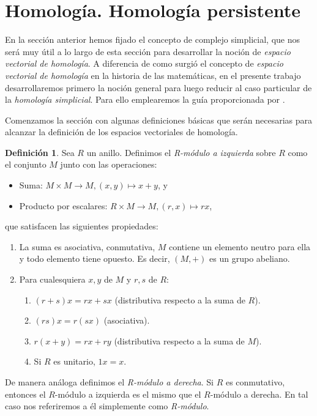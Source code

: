 \documentclass[12pt, a4paper, twoside]{book}
\numberwithin{equation}{section}
\theoremstyle{definition}
\newtheorem{defi}{Definición}[section]
\theoremstyle{remark}
\theoremstyle{plain}
\begin{document}
	\section{Homología. Homología persistente}
	
	En la sección anterior hemos fijado el concepto de complejo 
	simplicial, que nos será muy útil a lo largo de esta sección para 
	desarrollar la noción de \emph{espacio vectorial de homología}. A 
	diferencia de como surgió el concepto de \emph{espacio vectorial de
	homología} en la historia de las matemáticas, en el presente trabajo 
	desarrollaremos primero la noción general para luego reducir al caso 
	particular de la \emph{homología simplicial}. Para ello emplearemos la 
	guía proporcionada por \cite{TopoAlg-Edelsbrunner,Homologia-Macho,
	Algebra-Elduque}.

	Comenzamos la sección con algunas definiciones básicas que serán 
	necesarias para alcanzar la definición de los espacios vectoriales de 
	homología.

	\begin{defi}
		Sea $R$ un anillo. Definimos el \textit{R-módulo a izquierda} 
		sobre
		$R$ como el conjunto $M$ junto con las operaciones:
		\begin{itemize}
			\item Suma: $M \times M \rightarrow M, (x,y) \mapsto 
				x+y$, y
			\item Producto por escalares: $R \times M \rightarrow 
				M, (r,x) \mapsto rx$,	
		\end{itemize}
		que satisfacen las siguientes propiedades:
		\begin{enumerate}
			\item La suma es asociativa, conmutativa, $M$ contiene
			      un elemento neutro para ella y todo elemento 
			      tiene opuesto. Es decir, $(M,+)$ es un grupo 
			      abeliano.
		      \item Para cualesquiera $x,y$ de $M$ y $r,s$ de $R$: 
		      	\begin{enumerate}
			 	\item $(r+s)x=rx+sx$ (distributiva respecto a 
					la suma de $R$).
				\item $(rs)x=r(sx)$ (asociativa).
				\item $r(x+y)=rx+ry$ (distributiva respecto a 
					la suma de $M$).
				\item Si $R$ es unitario, $1x=x$.	
			\end{enumerate}
		\end{enumerate}
		De manera análoga definimos el \textit{R-módulo a derecha}. Si 
		$R$ es conmutativo, entonces el $R$-módulo a izquierda es el 
		mismo que el $R$-módulo a derecha. En tal caso nos referiremos 
		a
		él simplemente como \textit{R-módulo}.
	\end{defi}
\end{document}
